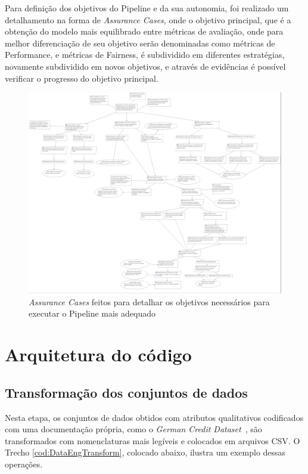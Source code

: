 \documentclass[portugues]{ic-tese}
\begin{document}
Para definição dos objetivos do Pipeline e da sua autonomia, foi realizado um detalhamento na forma de \textit{Assurance Cases}, onde o objetivo principal, que é a obtenção do modelo mais equilibrado entre métricas de avaliação, onde para melhor diferenciação de seu objetivo serão denominadas como métricas de Performance, e métricas de Fairness, é subdividido em diferentes estratégias, novamente subdividido em novos objetivos, e através de evidências é possível verificar o progresso do objetivo principal.

\begin{figure}[H]
\centering
\includegraphics[scale=0.1]{images/assurancecase.jpg}
\caption {\textit{Assurance Cases} feitos para detalhar os objetivos necessários para executar o Pipeline mais adequado}
\label{fig:AssuranceCase}
\end{figure}

\section{Arquitetura do código}

\subsection{Transformação dos conjuntos de dados}

Nesta etapa, os conjuntos de dados obtidos com atributos qualitativos codificados com uma documentação própria, como o \textit{German Credit Dataset}~\citep{ucigerman_2021}, são transformados com nomenclaturas mais legíveis e colocados em arquivos CSV. O Trecho \ref{cod:DataEngTransform}, colocado abaixo, ilustra um exemplo dessas operações.
\end{document}
